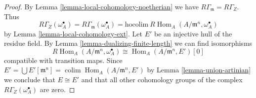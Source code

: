 \documentclass[10pt,a4paper]{amsart}
\theoremstyle{plain}
\theoremstyle{definition}
\theoremstyle{remark}
\numberwithin{equation}{subsection}
\def\colim{\mathop{\mathrm{colim}}\nolimits}
\def\Hom{\mathop{\mathrm{Hom}}\nolimits}
\begin{document}
\begin{proof}
By Lemma \ref{lemma-local-cohomology-noetherian} we have
$R\Gamma_{\mathfrak m} = R\Gamma_Z$. Thus
$$
R\Gamma_Z(\omega_A^\bullet) =
R\Gamma_{\mathfrak m}(\omega_A^\bullet) =
\text{hocolim}\ R\Hom_A(A/\mathfrak m^n, \omega_A^\bullet)
$$
by Lemma \ref{lemma-local-cohomology-ext}. Let $E'$ be an injective
hull of the residue field.
By Lemma \ref{lemma-dualizing-finite-length}
we can find isomorphisms
$$
R\Hom_A(A/\mathfrak m^n, \omega_A^\bullet) \cong \Hom_A(A/\mathfrak m^n, E')[0]
$$
compatible with transition maps. Since
$E' = \bigcup E'[\mathfrak m^n] = \colim \Hom_A(A/\mathfrak m^n, E')$
by Lemma \ref{lemma-union-artinian}
we conclude that $E \cong E'$ and that all other cohomology
groups of the complex $R\Gamma_Z(\omega_A^\bullet)$ are zero.
\end{proof}
\end{document}
